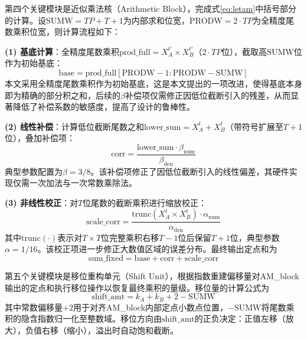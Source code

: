 \documentclass[12pt,a4paper,UTF8]{article}
\begin{document}
第四个关键模块是近似乘法核（Arithmetic Block），完成式\eqref{eq:letam}中括号部分的计算。设$\mathrm{SUMW} = TP + T + 1$为内部求和位宽，$\mathrm{PRODW} = 2 \cdot TP$为全精度尾数乘积位宽，则计算流程如下：

\textbf{(1) 基底计算}：全精度尾数乘积$\mathrm{prod\_full} = X_A^{t'} \times X_B^{t'}$（$2 \cdot TP$位），截取高$\mathrm{SUMW}$位作为初始基底：
\begin{equation}
\mathrm{base} = \mathrm{prod\_full}[\mathrm{PRODW}-1 : \mathrm{PRODW}-\mathrm{SUMW}]
\label{eq:am_base}
\end{equation}
本文采用全精度尾数乘积作为初始基底，这是本文提出的一项改进，使得基底本身即为精确的部分积之和，后续的$\beta$补偿项仅需修正因低位截断引入的残差，从而显著降低了补偿系数的敏感度，提高了设计的鲁棒性。

\textbf{(2) 线性补偿}：计算低位截断尾数之和$\mathrm{lower\_sum} = X_A^t + X_B^t$（带符号扩展至$T+1$位），叠加补偿项：
\begin{equation}
\mathrm{corr} = \frac{\mathrm{lower\_sum} \cdot \beta_{\mathrm{num}}}{\beta_{\mathrm{den}}}
\label{eq:am_corr}
\end{equation}
典型参数配置为$\beta = 3/8$。该补偿项修正了因低位截断引入的线性偏差，其硬件实现仅需一次加法与一次常数乘除法。

\textbf{(3) 非线性校正}：对$T$位尾数的截断乘积进行缩放校正：
\begin{equation}
\mathrm{scale\_corr} = \frac{\mathrm{trunc}(X_A^t \times X_B^t) \cdot \alpha_{\mathrm{num}}}{\alpha_{\mathrm{den}}}
\label{eq:am_scale}
\end{equation}
其中$\mathrm{trunc}(\cdot)$表示对$T \times T$位完整乘积右移$T-1$位后保留$T+1$位，典型参数$\alpha = 1/16$。该校正项进一步修正大数值区域的误差分布。最终输出定点和为
\begin{equation}
\mathrm{sum\_fixed} = \mathrm{base} + \mathrm{corr} + \mathrm{scale\_corr}
\label{eq:am_sum}
\end{equation}

第五个关键模块是移位重构单元（Shift Unit），根据指数重建偏移量对AM\_block输出的定点和执行移位操作以恢复最终乘积的量级。移位量的计算公式为
\begin{equation}
\mathrm{shift\_amt} = k_A + k_B + 2 - \mathrm{SUMW}
\label{eq:shift_amt}
\end{equation}
其中常数偏移量$+2$用于对齐AM\_block内部定点小数点位置，$-\mathrm{SUMW}$将尾数乘积的隐含指数归一化至整数域。移位方向由$\mathrm{shift\_amt}$的正负决定：正值左移（放大），负值右移（缩小），溢出时自动饱和截断。
\end{document}
